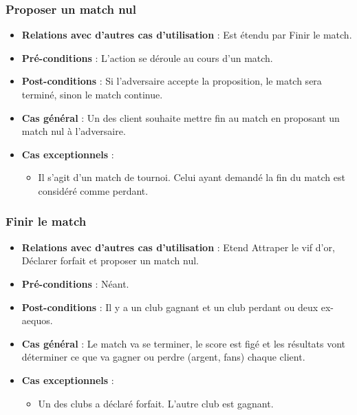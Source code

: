 \documentclass[a4paper,titlepage]{scrreprt}
\begin{document}
    \subsubsection{Proposer un match nul}
      \begin{itemize}
        \item \textbf{Relations avec d'autres cas d'utilisation}  : Est étendu par Finir le match.
        \item \textbf{Pré-conditions} : L'action se déroule au cours d'un match.
        \item \textbf{Post-conditions} : Si l'adversaire accepte la proposition, le match sera terminé, sinon le match continue.
        \item \textbf{Cas général} : Un des client souhaite mettre fin au match en proposant un match nul à l'adversaire. %
        \item \textbf{Cas exceptionnels} :
          \begin{itemize}
            \item Il s'agit d'un match de tournoi. Celui ayant demandé la fin du match est considéré comme perdant.
          \end{itemize}
      \end{itemize}

    \subsubsection{Finir le match}
      \begin{itemize}
        \item \textbf{Relations avec d'autres cas d'utilisation}  : Etend Attraper le vif d'or, Déclarer forfait et proposer un match nul.
        \item \textbf{Pré-conditions} : Néant.
        \item \textbf{Post-conditions} : Il y a un club gagnant et un club perdant ou deux ex-aequos.
        \item \textbf{Cas général} : Le match va se terminer, le score est figé et les résultats vont déterminer ce que va gagner ou perdre (argent, fans) chaque client.
        \item \textbf{Cas exceptionnels} :
          \begin{itemize}
            \item Un des clubs a déclaré forfait. L'autre club est gagnant.
          \end{itemize}
      \end{itemize}
\end{document}

